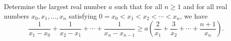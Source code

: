 Determine the largest real number $a$ such that for all $n \geq 1$ and for all real numbers $x_0, x_1, \ldots, x_n$ satisfying $0 = x_0 < x_1 < x_2 < \cdots < x_n$, we have
\[
\frac{1}{x_1 - x_0} + \frac{1}{x_2 - x_1} + \cdots + \frac{1}{x_n - x_{n-1}} \geq a\left(\frac{2}{x_1} + \frac{3}{x_2} + \cdots + \frac{n+1}{x_n}\right).
\]
